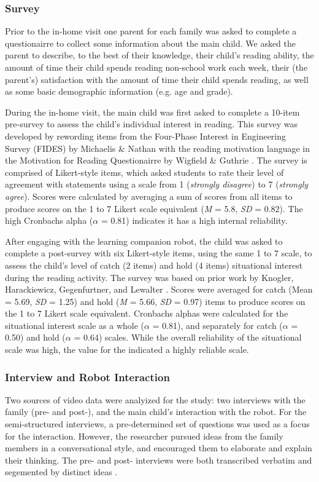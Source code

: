 \documentclass{sigchi}
\begin{document}
\subsubsection{Survey}

  Prior to the in-home visit one parent for each family was asked to complete a questionairre to collect some information about the main child.  We asked the parent to describe, to the best of their knowledge, their child's reading ability, the amount of time their child spends reading non-school work each week, their (the parent's) satisfaction with the amount of time their child spends reading, as well as some basic demographic information (e.g. age and grade).
  
  During the in-home visit, the main child was first asked to complete a 10-item pre-survey to assess the child's individual interest in reading.  This survey was developed by rewording items from the Four-Phase Interest in Engineering Survey (FIDES) by Michaelis \& Nathan \cite{Michaelis:2015} with the reading motivation language in the Motivation for Reading Questionairre by Wigfield \& Guthrie \cite{Wigfield:1997}. The survey is comprised of Likert-style items, which asked students to rate their level of agreement with statements using a scale from 1 (\textit{strongly disagree}) to 7 (\textit{strongly agree}). Scores were calculated by averaging a sum of scores from all items to produce scores on the 1 to 7 Likert scale equivalent (\textit{M} = 5.8, \textit{SD} = 0.82). The high Cronbachs alpha ($\alpha$ = 0.81) indicates it has a high internal reliability.
  
  After engaging with the learning companion robot, the child was asked to complete a post-survey with six Likert-style items, using the same 1 to 7 scale, to assess the child's level of catch (2 items) and hold (4 items) situational interest during the reading activity.  The survey was based on prior work by Knogler, Harackiewicz, Gegenfurtner, and Lewalter \cite{Knogler:2015}.  Scores were averaged for catch (Mean = 5.69, \textit{SD} = 1.25) and hold (\textit{M} = 5.66, \textit{SD} = 0.97) items to produce scores on the 1 to 7 Likert scale equivalent. Cronbachs alphas were calculated for the situational interest scale as a whole ($\alpha$ = 0.81), and separately for catch ($\alpha$ = 0.50) and hold ($\alpha$ = 0.64) scales.  While the overall reliability of the situational scale was high, the value for the  indicated a highly reliable scale.  
  
\subsubsection{Interview and Robot Interaction}
  Two sources of video data were analyized for the study: two interviews with the family (pre- and post-), and the main child's interaction with the robot. For the semi-structured interviews, a pre-determined set of questions was used as a focus for the interaction.  However, the researcher pursued ideas from the family members in a conversational style, and encouraged them to elaborate and explain their thinking. The pre- and post- interviews were both transcribed verbatim and segemented by distinct ideas \cite{Chi:1997}.
  
\end{document}
